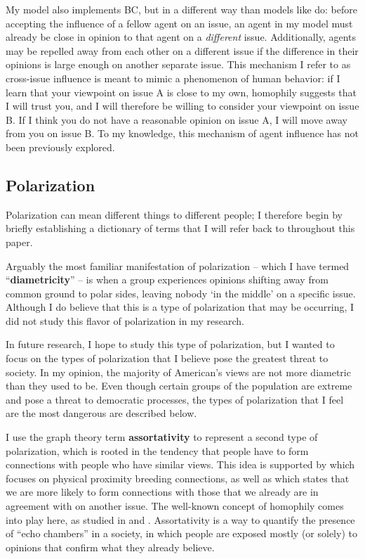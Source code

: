 My model also implements BC, but in
a different way than models like \cite{tsang_opinion_2014} do: before accepting
the influence of a fellow agent on an issue, an agent in my model must already
be close in opinion to that agent on a \textit{different} issue. Additionally, agents may be repelled away from each other on a different issue if the difference in their opinions is large enough on another separate issue. This mechanism I refer to as  
cross-issue influence is meant to mimic a phenomenon of human behavior: if I learn that your viewpoint on
issue A is close to my own, homophily suggests that I will trust you, and I
will therefore be willing to consider your viewpoint on issue B. If I think you do not have a reasonable opinion on issue A, I will move away from you on issue B. To my
knowledge, this mechanism of agent influence has not been previously explored.

\subsection{Polarization}

Polarization can mean different things to different people; I therefore begin
by briefly establishing a dictionary of terms that I will refer back to
throughout this paper.

Arguably the most familiar manifestation of polarization -- which I have termed
``\textbf{diametricity}'' -- is when a group experiences opinions shifting away
from common ground to polar sides, leaving nobody `in the middle' on a specific
issue. Although I do believe that this is a type of polarization that may be occurring, I did not study this flavor of polarization in my research. 

In future research, I hope to study this type of polarization, but I wanted to focus on the types of polarization that I believe pose the greatest threat to society. In my opinion, the majority of American's views are not more diametric than they used to be. Even though certain groups of the population are extreme and pose a threat to democratic processes, the types of polarization that I feel are the most dangerous are described below. 

I use the graph theory term \textbf{assortativity} to represent a second type
of polarization, which is rooted in the tendency that people have to form
connections with people who have similar views. This idea is supported by
\cite{klinkner_red_2005} which focuses on physical proximity breeding
connections, as well as \cite{cholvy_diffusion_2016} which states that we are
more likely to form connections with those that we already are in agreement
with on another issue. The well-known concept of homophily comes into play
here, as studied in \cite{davies_twin_2017} and \cite{taylor_exploring_2018}.
Assortativity is a way to quantify the presence of ``echo chambers'' in a
society, in which people are exposed mostly (or solely) to opinions that
confirm what they already
believe.\cite{dandekar_biased_2013,flaxman_filter_2016}

